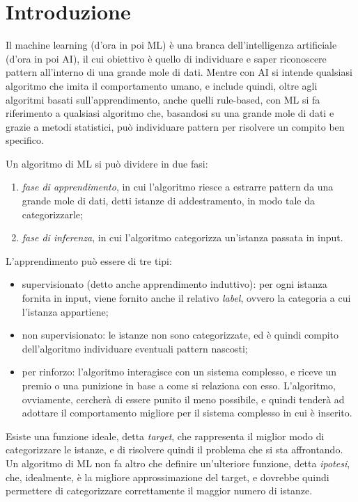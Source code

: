 \chapter{Introduzione}
Il machine learning (d'ora in poi ML) è una branca dell'intelligenza artificiale
(d'ora in poi AI), il cui obiettivo è quello di individuare e saper riconoscere
pattern all'interno di una grande mole di dati.
Mentre con AI si intende qualsiasi algoritmo che imita il comportamento umano, e
include quindi, oltre agli algoritmi basati sull'apprendimento, anche quelli
rule-based, con ML si fa riferimento a qualsiasi algoritmo che, basandosi su una
grande mole di dati e grazie a metodi statistici, può individuare pattern per
risolvere un compito ben specifico.

Un algoritmo di ML si può dividere in due fasi:
\begin{enumerate}
    \item \textit{fase di apprendimento}, in cui l'algoritmo riesce a estrarre
    pattern da una grande mole di dati, detti istanze di addestramento, in modo
    tale da categorizzarle;
    \item \textit{fase di inferenza}, in cui l'algoritmo categorizza un'istanza
    passata in input.
\end{enumerate}
L'apprendimento può essere di tre tipi:
\begin{itemize}
    \item supervisionato (detto anche apprendimento induttivo): per ogni istanza
    fornita in input, viene fornito anche il relativo \textit{label}, ovvero la
    categoria a cui l'istanza appartiene;
    \item non supervisionato: le istanze non sono categorizzate, ed è quindi
    compito dell'algoritmo individuare eventuali pattern nascosti;
    \item per rinforzo: l'algoritmo interagisce con un sistema complesso, e
    riceve un premio o una punizione in base a come si relaziona con esso.
    L'algoritmo, ovviamente, cercherà di essere punito il meno possibile, e
    quindi tenderà ad adottare il comportamento migliore per il sistema
    complesso in cui è inserito.
\end{itemize}
Esiste una funzione ideale, detta \textit{target}, che rappresenta il miglior
modo di categorizzare le istanze, e di risolvere quindi il problema che si sta
affrontando. Un algoritmo di ML non fa altro che definire un'ulteriore funzione,
detta \textit{ipotesi}, che, idealmente, è la migliore approssimazione del
target, e dovrebbe quindi permettere di categorizzare correttamente il maggior
numero di istanze.

